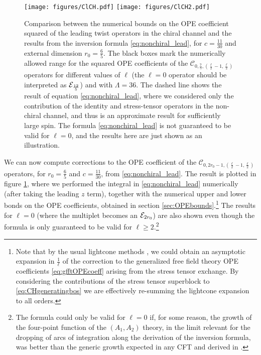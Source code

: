 \begin{figure}[htb!]
             \begin{center}           
              \texttt{[image: figures/ClCH.pdf]} \; \texttt{[image: figures/ClCH2.pdf]}
              \caption{Comparison between the numerical bounds on the OPE coefficient squared of the leading twist operators in the chiral channel and the results from  the inversion formula \eqref{eq:nonchiral_lead}, for $c=\tfrac{11}{30}$ and external dimension $r_0=\frac65$. The black boxes mark the numerically allowed range for the squared OPE coefficients of the $\mathcal{C}_{0,\frac75,\left(\frac{\ell }{2}-1,\frac{\ell }{2}\right)}$ operators for different values of $\ell$ (the $\ell=0$ operator should be interpreted as ${\mathcal{E}}_{\frac{12}5}$) and with $\Lambda=36$. The dashed line shows the result of equation \eqref{eq:nonchiral_lead}, where we considered only the contribution of the identity and stress-tensor operators in the non-chiral channel, and thus is an approximate result for sufficiently large spin. The formula \eqref{eq:nonchiral_lead} is not guaranteed to be valid for $\ell=0$, and the results here are just shown as an illustration.}
              \label{Fig:ClCH}
            \end{center}
\end{figure}
%

We can now compute corrections to the OPE coefficient of the $\mathcal{C}_{0,2 r_0-1,\left(\frac{\ell }{2}-1,\frac{\ell }{2}\right)}$ operators, for $r_0=\frac65$ and $c=\tfrac{11}{30}$, from \eqref{eq:nonchiral_lead}.
The result is plotted in figure \ref{Fig:ClCH}, where we performed the integral in \eqref{eq:nonchiral_lead} numerically (after taking the leading $z$ term), together with the numerical upper and lower bonds on the OPE coefficients, obtained in section \ref{sec:OPEbounds}.\footnote{Note that by the usual lightcone methods \cite{Fitzpatrick:2012yx,Komargodski:2012ek,Alday:2015ewa}, we could obtain an asymptotic expansion in $\tfrac{1}{\ell}$ of the correction to the generalized free field theory OPE coefficients \eqref{eq:gfftOPEcoeff} arising from the stress tensor exchange.  By considering the contributions of the stress tensor superblock to \eqref{eq:CHgeneratingbos} we are effectively re-summing the lightcone expansion to all orders.}
The results for $\ell=0$ (where the multiplet becomes an ${\mathcal{E}}_{2r_0}$) are also shown even though the formula is only guaranteed to be valid for $\ell \geqslant 2$.\footnote{The formula could only be valid for $\ell=0$ if, for some reason, the growth of the four-point function of the $(A_1,A_2)$ theory, in the limit relevant for the dropping of arcs of integration along the derivation of the inversion formula, was better than the generic growth expected in any CFT and derived in \cite{Caron-Huot:2017vep}.}



